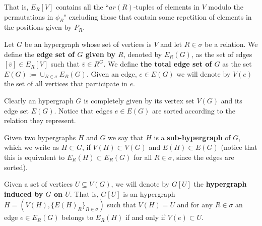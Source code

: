 \documentclass[12pt,notitlepage,a4paper]{article}
\theoremstyle{definition}
\begin{document}
That is, $E_R[V]$ contains all the ``$ar(R)$-tuples of elements
in $V$ modulo the permutations
in $\phi_R$" 
excluding those that contain some repetition of elements in
the positions given by $P_R$.\par
Let $G$ be an hypergraph whose set of vertices is $V$ and let $R\in \sigma$
be a relation. 
We define the \textbf{edge set of $G$ given by $R$}, denoted by $E_R(G)$, 
as the set of edges $[\overline{v}]\in E_R[V]$ such that $\overline{v}\in R^G$. 
We define \textbf{the total edge set of $G$} as the set $E(G):=\cup_{R\in \sigma} E_R(G)$.
Given an edge, $e\in E(G)$ we will denote by $V(e)$
the set of all vertices that participate in $e$. 
\par
Clearly an hypergraph $G$ is completely given by its vertex set $V(G)$ and its edge 
set $ E(G)$. Notice that edges $e\in E(G)$ are sorted according to the relation they represent.
\par

Given two hypergraphs $H$ and $G$ we say that $H$
is a \textbf{sub-hypergraph} of $G$, which we write as $H\subset G$,
if $V(H)\subset V(G)$ and $E(H)\subset E(G)$ (notice 
that this is equivalent to $E_R(H)\subset E_R(G)$ for all
$R\in \sigma$, since the edges are sorted).\par


Given a set of vertices $U\subseteq V(G)$, 
we will denote by $G[U]$ the \textbf{hypergraph induced
by $G$ on $U$}. That is, $G[U]$ is an hypergraph
$H=(V(H),\{E(H)_R\}_{R\in \sigma})$ such that 
$V(H)=U$ and for any $R\in \sigma$ 
an edge $e\in E_R(G)$ belongs 
to $E_R(H)$ if and only if $V(e)\subset U$.
\par
\end{document}
